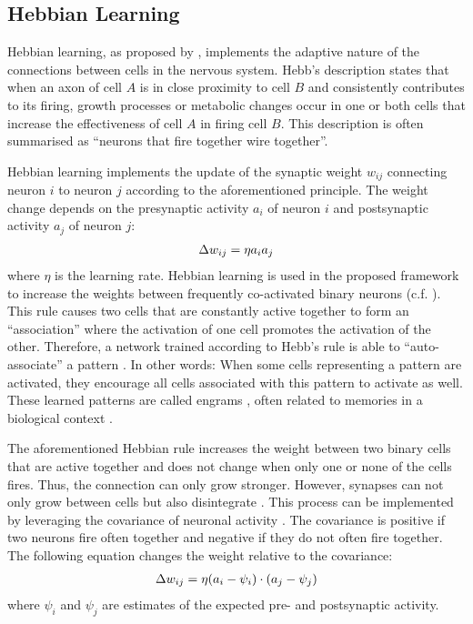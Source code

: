 \subsection{Hebbian Learning}
Hebbian learning, as proposed by , implements the adaptive nature of the connections between cells in the nervous system. Hebb's description states that when an axon of cell $A$ is in close proximity to cell $B$ and consistently contributes to its firing, growth processes or metabolic changes occur in one or both cells that increase the effectiveness of cell $A$ in firing cell $B$. This description is often summarised as ``neurons that fire together wire together''.

Hebbian learning implements the update of the synaptic weight $w_{ij}$ connecting neuron $i$ to neuron $j$ according to the aforementioned principle. The weight change depends on the presynaptic activity $a_i$ of neuron $i$ and postsynaptic activity $a_j$ of neuron $j$:
%
\begin{align}\eqlbl{hebb_1}
	\Delta w_{ij} = \eta a_i a_j
\end{align}
%
where \(\eta\) is the learning rate.
Hebbian learning is used in the proposed framework to increase the weights between frequently co-activated binary neurons (c.f. ).
This rule causes two cells that are constantly active together to form an ``association'' where the activation of one cell promotes the activation of the other.
Therefore, a network trained according to Hebb's rule is able to ``auto-associate'' a pattern \cite{hebb_organization_1949}. In other words: When some cells representing a pattern are activated, they encourage all cells associated with this pattern to activate as well. These learned patterns are called engrams , often related to memories in a biological context .

The aforementioned Hebbian rule increases the weight between two binary cells that are active together and does not change when only one or none of the cells fires. Thus, the connection can only grow stronger.
However, synapses can not only grow between cells but also disintegrate .
This process can be implemented by leveraging the covariance of neuronal activity .
The covariance is positive if two neurons fire often together and negative if they do not often fire together.
The following equation changes the weight relative to the covariance:
%
\begin{align}\eqlbl{hebb_2}
	\Delta w_{ij} = \eta (a_i - \psi_i) \cdot (a_j - \psi_j)
\end{align}
%
where \(\psi_i\) and \(\psi_j\) are estimates of the expected pre- and postsynaptic activity.

